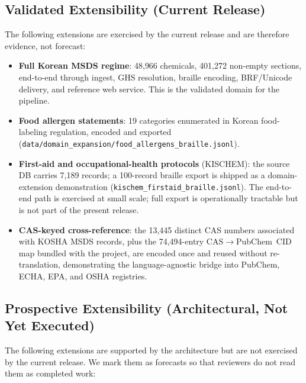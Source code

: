 \documentclass[journal]{IEEEtran}
\begin{document}
\subsection{Validated Extensibility (Current Release)}

The following extensions are exercised by the current release and are therefore evidence, not forecast:

\begin{itemize}
\item \textbf{Full Korean MSDS regime}: 48{,}966 chemicals, 401{,}272 non-empty sections, end-to-end through ingest, GHS resolution, braille encoding, BRF/Unicode delivery, and reference web service. This is the validated domain for the pipeline.
\item \textbf{Food allergen statements}: 19 categories enumerated in Korean food-labeling regulation, encoded and exported (\texttt{data/domain\_expansion/food\_allergens\_braille.jsonl}).
\item \textbf{First-aid and occupational-health protocols} (KISCHEM): the source DB carries 7{,}189 records; a 100-record braille export is shipped as a domain-extension demonstration (\texttt{kischem\_firstaid\_braille.jsonl}). The end-to-end path is exercised at small scale; full export is operationally tractable but is not part of the present release.
\item \textbf{CAS-keyed cross-reference}: the 13{,}445 distinct CAS numbers associated with KOSHA MSDS records, plus the 74{,}494-entry CAS$\rightarrow$PubChem~CID map bundled with the project, are encoded once and reused without re-translation, demonstrating the language-agnostic bridge into PubChem, ECHA, EPA, and OSHA registries.
\end{itemize}

\subsection{Prospective Extensibility (Architectural, Not Yet Executed)}

The following extensions are supported by the architecture but are not exercised by the current release. We mark them as forecasts so that reviewers do not read them as completed work:
\end{document}
